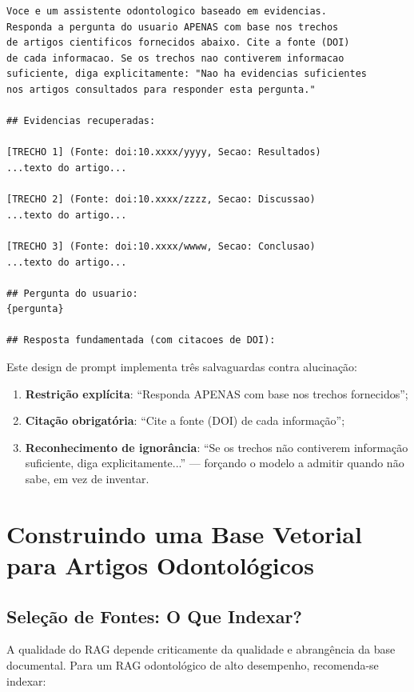 \begin{lstlisting}[language={}, caption={Template de prompt para RAG odontológico}]
Voce e um assistente odontologico baseado em evidencias.
Responda a pergunta do usuario APENAS com base nos trechos
de artigos cientificos fornecidos abaixo. Cite a fonte (DOI)
de cada informacao. Se os trechos nao contiverem informacao
suficiente, diga explicitamente: "Nao ha evidencias suficientes
nos artigos consultados para responder esta pergunta."

## Evidencias recuperadas:

[TRECHO 1] (Fonte: doi:10.xxxx/yyyy, Secao: Resultados)
...texto do artigo...

[TRECHO 2] (Fonte: doi:10.xxxx/zzzz, Secao: Discussao)
...texto do artigo...

[TRECHO 3] (Fonte: doi:10.xxxx/wwww, Secao: Conclusao)
...texto do artigo...

## Pergunta do usuario:
{pergunta}

## Resposta fundamentada (com citacoes de DOI):
\end{lstlisting}

Este design de prompt implementa três salvaguardas contra alucinação:
\begin{enumerate}
    \item \textbf{Restrição explícita}: ``Responda APENAS com base nos trechos fornecidos'';
    \item \textbf{Citação obrigatória}: ``Cite a fonte (DOI) de cada informação'';
    \item \textbf{Reconhecimento de ignorância}: ``Se os trechos não contiverem informação suficiente, diga explicitamente...'' --- forçando o modelo a admitir quando não sabe, em vez de inventar.
\end{enumerate}

\section{Construindo uma Base Vetorial para Artigos Odontológicos}

\subsection{Seleção de Fontes: O Que Indexar?}

A qualidade do RAG depende criticamente da qualidade e abrangência da base documental. Para um RAG odontológico de alto desempenho, recomenda-se indexar:

